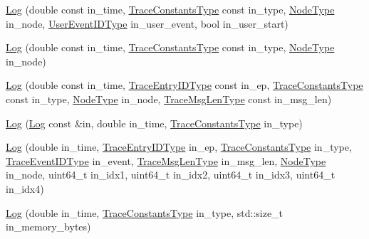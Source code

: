 \begin{DoxyCompactItemize}
\item 
\hyperlink{structvt_1_1trace_1_1_log_a79db16327d513ab1b4ecd114a5661e71}{Log} (double const in\+\_\+time, \hyperlink{namespacevt_1_1trace_acf454dfbd581b0ebae895f90b5927a1d}{Trace\+Constants\+Type} const in\+\_\+type, \hyperlink{namespacevt_a866da9d0efc19c0a1ce79e9e492f47e2}{Node\+Type} in\+\_\+node, \hyperlink{namespacevt_1_1trace_a5908920d051c144c89f17c69ed262350}{User\+Event\+I\+D\+Type} in\+\_\+user\+\_\+event, bool in\+\_\+user\+\_\+start)
\item 
\hyperlink{structvt_1_1trace_1_1_log_acdd2da55901a3de70e02d68f78b6d3b6}{Log} (double const in\+\_\+time, \hyperlink{namespacevt_1_1trace_acf454dfbd581b0ebae895f90b5927a1d}{Trace\+Constants\+Type} const in\+\_\+type, \hyperlink{namespacevt_a866da9d0efc19c0a1ce79e9e492f47e2}{Node\+Type} in\+\_\+node)
\item 
\hyperlink{structvt_1_1trace_1_1_log_a6a70a5ee694d066e4cd7332e4c11ad52}{Log} (double const in\+\_\+time, \hyperlink{namespacevt_1_1trace_a3c14050715ba9eceaeff51fb3de64f2f}{Trace\+Entry\+I\+D\+Type} const in\+\_\+ep, \hyperlink{namespacevt_1_1trace_acf454dfbd581b0ebae895f90b5927a1d}{Trace\+Constants\+Type} const in\+\_\+type, \hyperlink{namespacevt_a866da9d0efc19c0a1ce79e9e492f47e2}{Node\+Type} in\+\_\+node, \hyperlink{namespacevt_1_1trace_aeb598f45d67d41db7902e494f2f0ce59}{Trace\+Msg\+Len\+Type} const in\+\_\+msg\+\_\+len)
\item 
\hyperlink{structvt_1_1trace_1_1_log_a3824153f3da56014a1473b518eee5654}{Log} (\hyperlink{structvt_1_1trace_1_1_log}{Log} const \&in, double in\+\_\+time, \hyperlink{namespacevt_1_1trace_acf454dfbd581b0ebae895f90b5927a1d}{Trace\+Constants\+Type} in\+\_\+type)
\item 
\hyperlink{structvt_1_1trace_1_1_log_ab48521fa03009ac8033116f7f06b195b}{Log} (double in\+\_\+time, \hyperlink{namespacevt_1_1trace_a3c14050715ba9eceaeff51fb3de64f2f}{Trace\+Entry\+I\+D\+Type} in\+\_\+ep, \hyperlink{namespacevt_1_1trace_acf454dfbd581b0ebae895f90b5927a1d}{Trace\+Constants\+Type} in\+\_\+type, \hyperlink{namespacevt_1_1trace_a64a7185f3e102df8d8258f263ccd1582}{Trace\+Event\+I\+D\+Type} in\+\_\+event, \hyperlink{namespacevt_1_1trace_aeb598f45d67d41db7902e494f2f0ce59}{Trace\+Msg\+Len\+Type} in\+\_\+msg\+\_\+len, \hyperlink{namespacevt_a866da9d0efc19c0a1ce79e9e492f47e2}{Node\+Type} in\+\_\+node, uint64\+\_\+t in\+\_\+idx1, uint64\+\_\+t in\+\_\+idx2, uint64\+\_\+t in\+\_\+idx3, uint64\+\_\+t in\+\_\+idx4)
\item 
\hyperlink{structvt_1_1trace_1_1_log_aaa26486d549d2e6792603318813d4e83}{Log} (double in\+\_\+time, \hyperlink{namespacevt_1_1trace_acf454dfbd581b0ebae895f90b5927a1d}{Trace\+Constants\+Type} in\+\_\+type, std\+::size\+\_\+t in\+\_\+memory\+\_\+bytes)

\end{DoxyCompactItemize}
